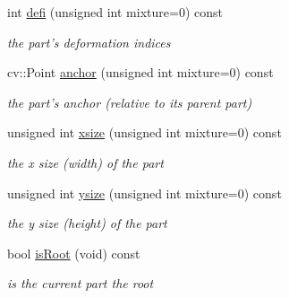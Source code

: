 \begin{DoxyCompactItemize}
int \hyperlink{classComponentPart_a486ffe6a891ce264ef2a5fb37a7a7b3b}{defi} (unsigned int mixture=0) const 
\begin{DoxyCompactList}\small\item\em the part's deformation indices \end{DoxyCompactList}\item 
cv\-::\-Point \hyperlink{classComponentPart_a1e3abbf1e0b4ec1619852eb5e60d4c41}{anchor} (unsigned int mixture=0) const 
\begin{DoxyCompactList}\small\item\em the part's anchor (relative to its parent part) \end{DoxyCompactList}\item 
unsigned int \hyperlink{classComponentPart_a64ed589f53da37deab72106e687c3d11}{xsize} (unsigned int mixture=0) const 
\begin{DoxyCompactList}\small\item\em the x size (width) of the part \end{DoxyCompactList}\item 
unsigned int \hyperlink{classComponentPart_a40218970509724b43909c9003f042301}{ysize} (unsigned int mixture=0) const 
\begin{DoxyCompactList}\small\item\em the y size (height) of the part \end{DoxyCompactList}\item 
bool \hyperlink{classComponentPart_a5c2cb9582276cb9cfa11cd9ba95aac85}{is\-Root} (void) const 
\begin{DoxyCompactList}\small\item\em is the current part the root \end{DoxyCompactList}\end{DoxyCompactItemize}

